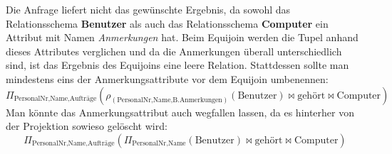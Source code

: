 \documentclass[a4paper,11pt]{article}             %
\begin{document}
\setcounter{excnt}{15}
\begin{ex}
  Die Anfrage liefert nicht das gewünschte Ergebnis, da sowohl das
  Relationsschema \textbf{Benutzer} als auch das Relationsschema
  \textbf{Computer} ein Attribut mit Namen \emph{Anmerkungen} hat.
  Beim Equijoin werden die Tupel anhand dieses Attributes verglichen und da die
  Anmerkungen überall unterschiedlich sind, ist das Ergebnis des Equijoins eine
  leere Relation. Stattdessen sollte man mindestens eins der Anmerkungsattribute vor dem
  Equijoin umbenennen:
  \begin{equation*}
   \Pi_{\text{PersonalNr,Name,Aufträge}}(\rho_{(\text{PersonalNr,Name,B.Anmerkungen})}(\text{Benutzer})\bowtie\text{gehört}\bowtie\text{Computer}) 
  \end{equation*}
  Man könnte das Anmerkungsattribut auch wegfallen lassen, da es hinterher von
  der Projektion sowieso gelöscht wird:
  \begin{equation*}
   \Pi_{\text{PersonalNr,Name,Aufträge}}(\Pi_{\text{PersonalNr,Name}}(\text{Benutzer})\bowtie\text{gehört}\bowtie\text{Computer}) 
  \end{equation*}
\end{ex}
\end{document}
